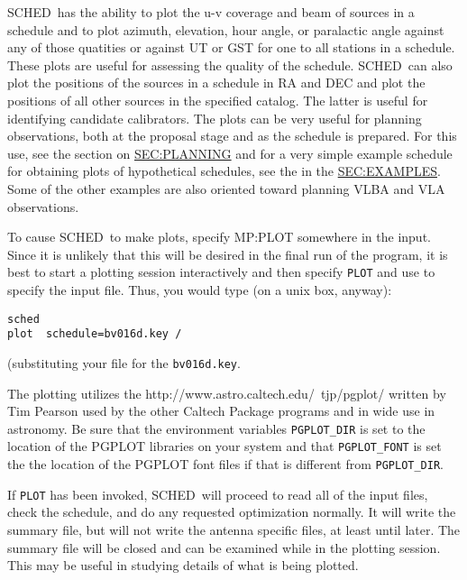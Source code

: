 \documentclass{report}
\newcommand{\schedb}{{\sc SCHED~}}
\begin{document}
\schedb has the ability to plot the u-v coverage and beam of sources in a
schedule and to plot azimuth, elevation, hour angle, or paralactic
angle against any of those quatities or against UT or GST for one to
all stations in a schedule.  These plots are useful for assessing the
quality of the schedule.  \schedb can also plot the positions of the
sources in a schedule in RA and DEC and plot the positions of all
other sources in the specified catalog.  The latter is useful for
identifying candidate calibrators.  The plots can be very useful
for planning observations, both at the proposal stage and as the
schedule is prepared.  For this use, see the section on
\hyperref{planning}{planning (Section }{)}{SEC:PLANNING} and for a
very simple example schedule for obtaining plots of hypothetical
schedules, see the  in the
\hyperref{Examples section.}{Examples Section
(Section}{).}{SEC:EXAMPLES}.  Some of the other examples are also
oriented toward planning VLBA and VLA observations.

To cause \schedb to make plots, specify  {MP:PLOT}
somewhere in the input.  Since it is unlikely that this will be
desired in the final run of the program, it is best to start a
plotting session interactively and then specify {\tt PLOT} and use
 to specify the input file.
Thus, you would type (on a unix box, anyway):

\begin{verbatim}
sched
plot  schedule=bv016d.key /
\end{verbatim}

(substituting your file for the {\tt bv016d.key}.

The plotting utilizes the  {http://www.astro.caltech.edu/~tjp/pgplot/} written by Tim
Pearson used by the other Caltech Package programs and in wide use in
astronomy.  Be sure that the environment variables {\tt PGPLOT\_DIR}
is set to the location of the {\sc PGPLOT} libraries on your system
and that {\tt PGPLOT\_FONT} is set the the location of the {\sc
PGPLOT} font files if that is different from {\tt PGPLOT\_DIR}.

If {\tt PLOT} has been invoked, \schedb will proceed to read all of
the input files, check the schedule, and do any requested optimization
normally.  It will write the summary file, but will not write the
antenna specific files, at least until later.  The summary file will
be closed and can be examined while in the plotting session.  This may
be useful in studying details of what is being plotted.
\end{document}
